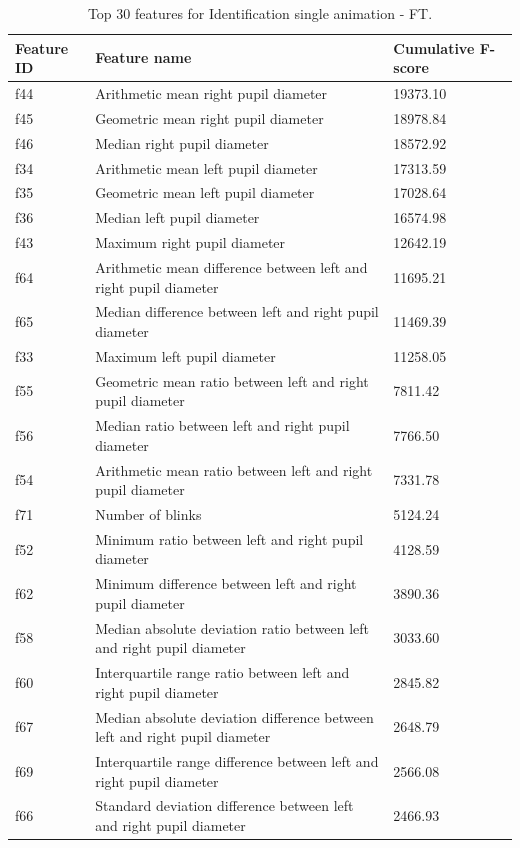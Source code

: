 \documentclass[12pt]{report}
\begin{document}
\begin{table}[htbp]
\centering
\scriptsize
\setlength{\tabcolsep}{3pt}
\caption{Top 30 features for Identification single animation - FT.}
\label{tab:top30_id_s_ft}
\begin{tabular}{lll}
\toprule
\textbf{Feature ID} & \textbf{Feature name} & \textbf{Cumulative F-score} \\
\midrule
f44 & Arithmetic mean right pupil diameter & 19373.10 \\
f45 & Geometric mean right pupil diameter & 18978.84 \\
f46 & Median right pupil diameter & 18572.92 \\
f34 & Arithmetic mean left pupil diameter & 17313.59 \\
f35 & Geometric mean left pupil diameter & 17028.64 \\
f36 & Median left pupil diameter & 16574.98 \\
f43 & Maximum right pupil diameter & 12642.19 \\
f64 & Arithmetic mean difference between left and right pupil diameter & 11695.21 \\
f65 & Median difference between left and right pupil diameter & 11469.39 \\
f33 & Maximum left pupil diameter & 11258.05 \\
f55 & Geometric mean ratio between left and right pupil diameter & 7811.42 \\
f56 & Median ratio between left and right pupil diameter & 7766.50 \\
f54 & Arithmetic mean ratio between left and right pupil diameter & 7331.78 \\
f71 & Number of blinks & 5124.24 \\
f52 & Minimum ratio between left and right pupil diameter & 4128.59 \\
f62 & Minimum difference between left and right pupil diameter & 3890.36 \\
f58 & Median absolute deviation ratio between left and right pupil diameter & 3033.60 \\
f60 & Interquartile range ratio between left and right pupil diameter & 2845.82 \\
f67 & Median absolute deviation difference between left and right pupil diameter & 2648.79 \\
f69 & Interquartile range difference between left and right pupil diameter & 2566.08 \\
f66 & Standard deviation difference between left and right pupil diameter & 2466.93 \\

\end{tabular}
\end{table}
\end{document}
